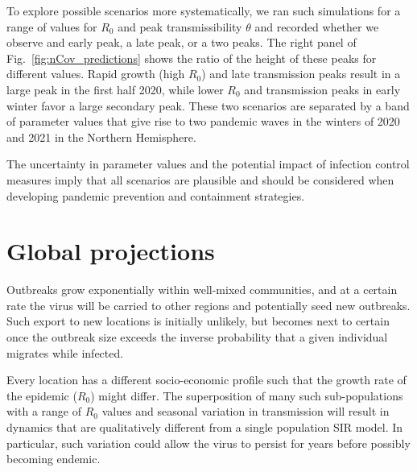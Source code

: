 \documentclass[rmp, reprint, superscriptaddress, floatfix,amsmath]{revtex4-1}
\begin{document}
To explore possible scenarios more systematically, we ran such simulations for a range of values for $R_0$ and peak transmissibility $\theta$ and recorded whether we observe and early peak, a late peak, or a two peaks. 
The right panel of Fig.~\ref{fig:nCov_predictions} shows the ratio of the height of these peaks for different values.
Rapid growth (high $R_0$) and late transmission peaks result in a large peak in the first half 2020, while lower $R_0$ and transmission peaks in early winter favor a large secondary peak. 
These two scenarios are separated by a band of parameter values that give rise to two pandemic waves in the winters of 2020 and 2021 in the Northern Hemisphere.

The uncertainty in parameter values and the potential impact of infection control measures imply that all scenarios are plausible and should be considered when developing pandemic prevention and containment strategies.


\section{Global projections}
Outbreaks grow exponentially within well-mixed communities, and at a certain rate the virus will be carried to other regions and potentially seed new outbreaks. 
Such export to new locations is initially unlikely, but becomes next to certain once the outbreak size exceeds the inverse probability that a given individual migrates while infected.

Every location has a different socio-economic profile such that the growth rate of the epidemic ($R_0$) might differ. 
The superposition of many such sub-populations with a range of $R_0$ values and seasonal variation in transmission will result in dynamics that are qualitatively different from a single population SIR model. 
In particular, such variation could allow the virus to persist for years before possibly becoming endemic. 
\end{document}
